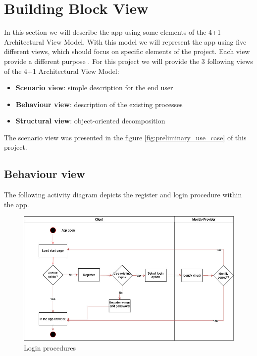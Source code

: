 \section{Building Block View}

In this section we will describe the \gls{app} using some elements of the 4+1 Architectural View Model. With this model we will represent
the \gls{app} using five different views, which should focus on specific elements of the project. Each view provide
a different purpose \cite{refart:KR41}. For this project we will provide the 3 following views of the 4+1 Architectural View 
Model:

\begin{itemize}
    \item \textbf{Scenario view}: simple description for the end user 
    \item \textbf{Behaviour view}: description of the existing processes
    \item \textbf{Structural view}: object-oriented decomposition
\end{itemize}

The scenario view was presented in the figure \ref{fig:preliminary_use_case} of this project.

\subsection{Behaviour view}
The following \gls{activity diagram} depicts the register and login procedure within the app.

\begin{figure}[H]
    \centering
    \includegraphics[width=1\textwidth]{assets/login_AC.jpg}
    \caption{Login procedures}
    \label{fig:login_register}
\end{figure}


